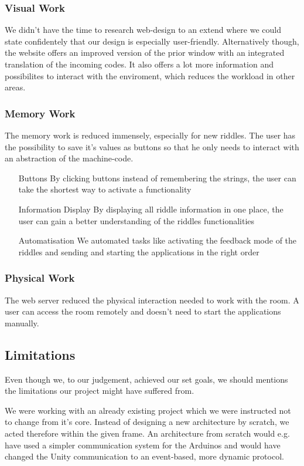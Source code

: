 \subsubsection{Visual Work}
We didn't have the time to research web-design to an extend where we could state confidentely that our design is especially user-friendly.
Alternatively though, the website offers an improved version of the prior window with an integrated translation of the incoming codes.
It also offers a lot more information and possibilites to interact with the enviroment, which reduces the workload in other areas.
\subsubsection{Memory Work}
The memory work is reduced immensely, especially for new riddles. 
The user has the possibility to save it's values as buttons so that he only needs to interact with an abstraction of the machine-code.
\begin{itemize}
    \item [Buttons] By clicking buttons instead of remembering the strings, the user can take the shortest way to activate a functionality
    \item [Information Display] By displaying all riddle information in one place, the user can gain a better understanding of the riddles functionalities
    \item [Automatisation] 
    We automated tasks like activating the feedback mode of the riddles and sending 
    and starting the applications in the right order
\end{itemize}
\subsubsection{Physical Work}
The web server reduced the physical interaction needed to work with the room. 
A user can access the room remotely and doesn't need to start the applications manually.
\subsection{Limitations}
Even though we, to our judgement, achieved our set goals, 
we should mentions the limitations our project might have suffered from.

We were working with an already existing project which we were instructed not to change from it's core. 
Instead of designing a new architecture by scratch, we acted therefore within the given frame. 
An architecture from scratch would e.g. have used a simpler communication system for the Arduinos and would have changed 
the Unity communication to an event-based, more dynamic protocol.  

